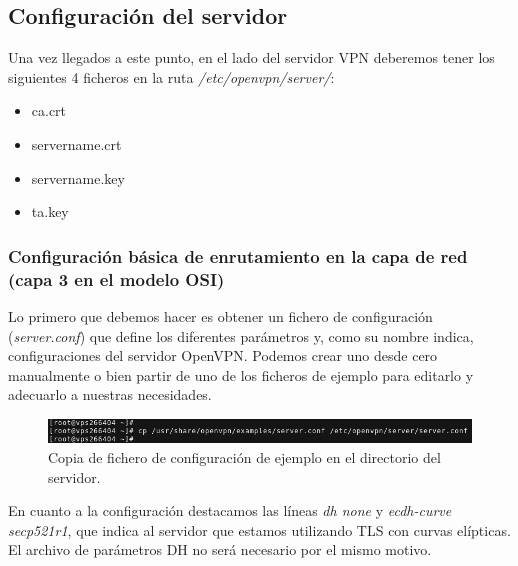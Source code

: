 \documentclass[a4paper, 11pt, titlepage]{article}
\begin{document}
    \newpage
    \newpage
    \newpage
    \subsection{Configuración del servidor}

        Una vez llegados a este punto, en el lado del servidor VPN deberemos tener los siguientes
        4 ficheros en la ruta \textit{/etc/openvpn/server/}:

        \begin{itemize}
            \item ca.crt
            \item servername.crt
            \item servername.key
            \item ta.key
        \end{itemize}

        \subsubsection{Configuración básica de enrutamiento en la capa de red (capa 3 en el modelo
        OSI)}

            Lo primero que debemos hacer es obtener un fichero de configuración (\textit{server.conf}) que define
            los diferentes parámetros y, como su nombre indica, configuraciones del servidor OpenVPN. Podemos crear 
            uno desde cero manualmente o bien partir de uno de los ficheros de ejemplo para editarlo y adecuarlo a 
            nuestras necesidades.
        
            \begin{figure}[htp]
                \centering
                \includegraphics[width=1\textwidth]{resources/openvpn04.png}
                \caption{Copia de fichero de configuración de ejemplo en el directorio del servidor.}
                \label{}
            \end{figure}
        
            En cuanto a la configuración destacamos las líneas \textit{dh none} y \textit{ecdh-curve secp521r1}, que
            indica al servidor que estamos utilizando TLS con curvas elípticas. El archivo de parámetros DH no será
            necesario por el mismo motivo.
        
\end{document}
